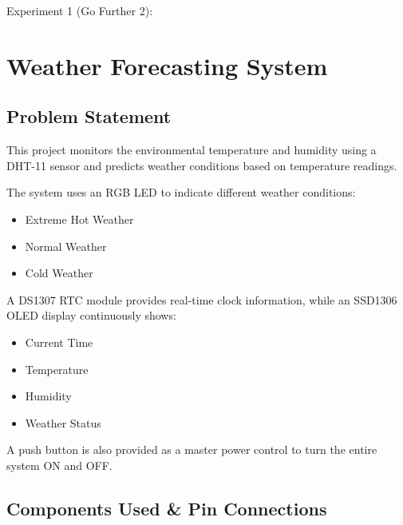 
\clearpage
Experiment 1 (Go Further 2):
\section{Weather Forecasting System}

\subsection{Problem Statement}

This project monitors the environmental temperature and humidity using a DHT-11 sensor and predicts weather conditions based on temperature readings.

The system uses an RGB LED to indicate different weather conditions:

\begin{itemize}
    \item Extreme Hot Weather
    \item Normal Weather
    \item Cold Weather
\end{itemize}

A DS1307 RTC module provides real-time clock information, while an SSD1306 OLED display continuously shows:

\begin{itemize}
    \item Current Time
    \item Temperature
    \item Humidity
    \item Weather Status
\end{itemize}

A push button is also provided as a master power control to turn the entire system ON and OFF.


\subsection{Components Used \& Pin Connections}

